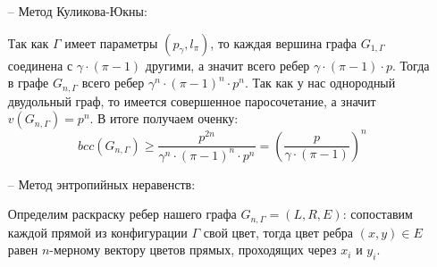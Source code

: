 \documentclass[a4paper]{article}
\newtheorem*{mlemma}{Лемма}
\newtheorem*{msolution}{Доказательство}
\begin{document}
\begin{itemize}[noitemsep]
     
     \begin{mlemma}
         Если в $G_{1, \Gamma}$ существует трудное множество размера $k$, то в $G_{n, \Gamma}$ 
         существует трудное множество размера $k^n$
     \end{mlemma}
     \begin{msolution}
        Докажем вначале, что если в графе $G_1$ имеется трудное множество размера $n_1$, а в графе 
        $G_2$ -- трудное множество размера $n_2$, тогда в $G_1 \otimes G_2$ можно найти трудное 
        множество размера $n_1\cdot n_2$ (где $\otimes$ - произведение Кронекера). Пусть $\{v_{i,j}\}$ 
        трудное множество в графе $G_1$, тогда в каждой подматрице $v_{i, j}\cdot G_2$ матрицы 
        графа $G_1 \otimes G_2$ рассмотрим клетки, соответствующие трудному множеству графа $G_2$. 
        Всего мы получили $n_1\cdot n_2$ клеток, образующих трудное множество графа $G_1 \otimes G_2$ 
        по построению.
        
        Вернемся к доказательству леммы. Так как матрица графа $G_{n, \Gamma}$ есть не что иное, как 
        Кронекерово произведение $n$ матриц графа $G_{1, \Gamma}$, то мы можем найти трудное множество 
        размера $k^n$. $\square$
     \end{msolution}
     
     В итоге мы получили, что если $\Gamma$ является аналогом полного двудольного графа, то 
     $$bcc(G_{n, \Gamma}) \geq 2^n$$ иначе $$bcc(G_{n, \Gamma}) \geq 3^n$$
     
     \item[--] Метод Куликова-Юкны:
     
     Так как $\Gamma$ имеет параметры $(p_{\gamma}, l_{\pi})$, то каждая вершина графа $G_{1,\Gamma}$ 
     соединена с $\gamma\cdot (\pi - 1)$ другими, а значит всего ребер $\gamma\cdot (\pi - 1)\cdot p$. Тогда в графе 
     $G_{n, \Gamma}$ всего ребер $\gamma^n\cdot (\pi - 1)^n\cdot p^n$. Так как у нас однородный двудольный граф, 
     то имеется совершенное паросочетание, а значит $v(G_{n, \Gamma}) = p^n$. В итоге получаем оченку:
     $$bcc(G_{n,\Gamma}) \geq \frac{p^{2n}}{\gamma^n\cdot (\pi - 1)^n\cdot p^n} = \left(\frac{p}{\gamma\cdot (\pi -1)}\right)^n$$
     
     \item[--] Метод энтропийных неравенств:
     
     Определим раскраску ребер нашего графа $G_{n,\Gamma} = (L, R, E)$: сопоставим каждой прямой из
     конфигурации $\Gamma$ свой цвет, тогда цвет ребра $(x, y)\in E$ равен $n$-мерному вектору цветов 
     прямых, проходящих через $x_i$ и  $y_i$.
     

\end{itemize}
\end{document}
